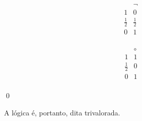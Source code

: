 \begin{definicao}
    \begin{minipage}{0.5\textwidth}
        \[
            \begin{array}{c|c}
                            & \neg        \\
                \hline
                1           & 0           \\
                \frac{1}{2} & \frac{1}{2} \\
                0           & 1           \\
            \end{array}
        \]
    \end{minipage}
    \begin{minipage}{0.3\textwidth}
        \[
            \begin{array}{c|c}
                            & \circ   \\
                \hline
                1           & 1         \\
                \frac{1}{2} & 0         \\
                0           & 1         \\
            \end{array}
        \]
    \end{minipage}

    \noindent
    \qed{}
\end{definicao}

A lógica \lfium{} é, portanto, dita trivalorada.

